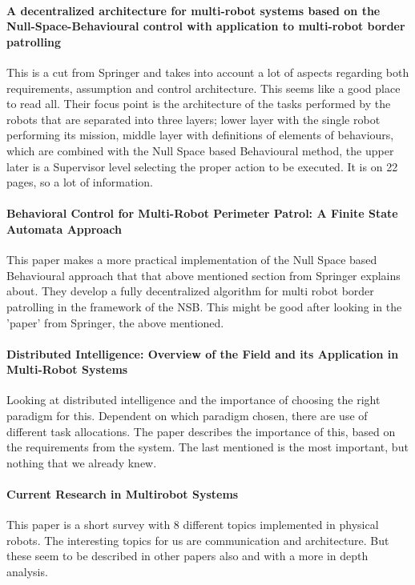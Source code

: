 \paragraph{A decentralized architecture for multi-robot systems based on the Null-Space-Behavioural control with application to multi-robot border patrolling}
This is a cut from Springer and takes into account a lot of aspects regarding both requirements, assumption and control architecture. This seems like a good place to read all. Their focus point is the architecture of the tasks performed by the robots that are separated into three layers; lower layer with the single robot performing its mission, middle layer with definitions of elements of behaviours, which are combined with the Null Space based Behavioural method, the upper later is a Supervisor level selecting the proper action to be executed. It is on 22 pages, so a lot of information.

\paragraph{Behavioral Control for Multi-Robot Perimeter Patrol: A Finite State Automata Approach}
This paper makes a more practical implementation of the Null Space based Behavioural approach that that above mentioned section from Springer explains about. They develop a fully decentralized algorithm for multi robot border patrolling in the framework of the NSB.
This might be good after looking in the 'paper' from Springer, the above mentioned.

{\vskip0pt\color{gray}
\paragraph{Distributed Intelligence: Overview of the Field and its Application in Multi-Robot Systems}
Looking at distributed intelligence and the importance of choosing the right paradigm for this. Dependent on which paradigm chosen, there are use of different task allocations. The paper describes the importance of this, based on the requirements from the system.
The last mentioned is the most important, but nothing that we already knew.}

\paragraph{Current Research in Multirobot Systems}
This paper is a short survey with 8 different topics implemented in physical robots. The interesting topics for us are communication and architecture.
But these seem to be described in other papers also and with a more in depth analysis.

